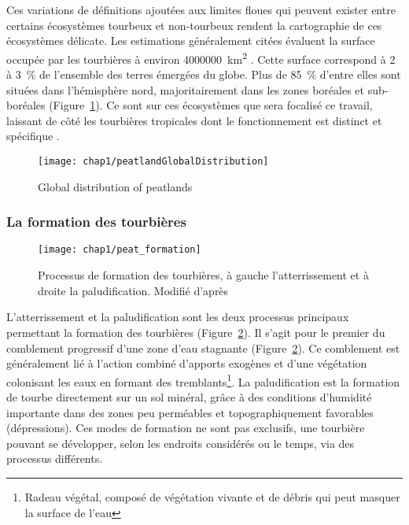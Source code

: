 Ces variations de définitions ajoutées aux limites floues qui peuvent exister entre certains écosystèmes tourbeux et non-tourbeux rendent la cartographie de ces écosystèmes délicate.
Les estimations généralement citées évaluent la surface occupée par les tourbières à environ \SI{4000000}{\square\kilo\meter} \citep{lappalainen1996}. 
Cette surface correspond à \num{2} à \SI{3}{\percent} de l'ensemble des terres émergées du globe.
Plus de \SI{85}{\percent} d'entre elles sont situées dans l'hémisphère nord, majoritairement dans les zones boréales et sub-boréales \citep{strack2008} (Figure~\ref{fig:peatlandGlobalDistribution}).
Ce sont sur ces écosystèmes que sera focalisé ce travail, laissant de côté les tourbières tropicales dont le fonctionnement est distinct et spécifique \plop.

\begin{figure}
\centering
\texttt{[image: chap1/peatlandGlobalDistribution]}
\caption{Global distribution of peatlands}
\label{fig:peatlandGlobalDistribution} 
\end{figure}

\subsubsection{La formation des tourbières}

\begin{figure}
\centering
\texttt{[image: chap1/peat\_formation]}
\caption{Processus de formation des tourbières, à gauche l'atterrissement et à droite la paludification. Modifié d'après \citet{manneville1999}}
\label{fig:peat_formation}
\end{figure}

L'atterrissement et la paludification sont les deux processus principaux permettant la formation des tourbières (Figure~\ref{fig:peat_formation}).
Il s'agit pour le premier du comblement progressif d'une zone d'eau stagnante (Figure~\ref{fig:peat_formation}).
Ce comblement est généralement lié à l'action combiné d'apports exogènes et d'une végétation colonisant les eaux en formant des tremblants\footnote{Radeau végétal, composé de végétation vivante et de débris qui peut masquer la surface de l'eau}.
La paludification est la formation de tourbe directement sur un sol minéral, grâce à des conditions d'humidité importante dans des zones peu perméables et topographiquement favorables (dépressions).
Ces modes de formation ne sont pas exclusifs, une tourbière pouvant se développer, selon les endroits considérés ou le temps, via des processus différents.

